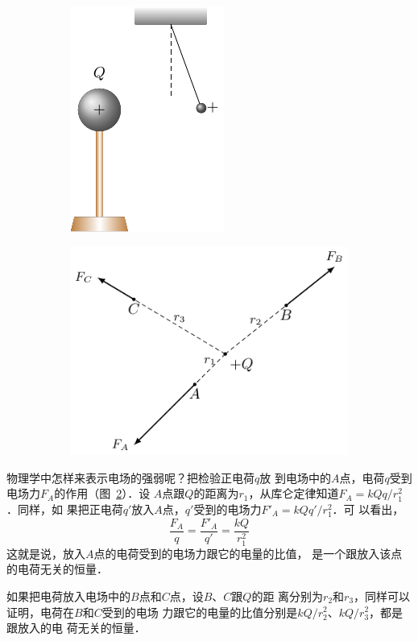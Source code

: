 \begin{figure}[htbp]
	\centering
	\begin{subfigure}{0.4\linewidth}
		\centering
		\includegraphics{fig/B/6-4a.pdf}
		\caption{}\label{fig_B_6-4a}
	\end{subfigure}
	\hfil
	\begin{subfigure}{0.4\linewidth}
		\centering
		\includegraphics{fig/B/6-4b.pdf}
		\caption{}\label{fig_B_6-4b}
	\end{subfigure}
	\caption{}\label{fig_B_6-4}
\end{figure}



物理学中怎样来表示电场的强弱呢？把检验正电荷$q$放
到电场中的$A$点，电荷$q$受到电场力$F_A$的作用（图~\ref{fig_B_6-4b}）．设
$A$点跟$Q$的距离为$r_1$，从库仑定律知道$F_A=kQq/r^2_1$．同样，如
果把正电荷$q'$放入$A$点，$q'$受到的电场力$F'_A=kQq'/r_1^2$．可
以看出，
\[\frac{F_A}{q}=\frac{F'_A}{q'}=\frac{kQ}{r^2_1} \]
这就是说，放入$A$点的电荷受到的电场力跟它的电量的比值，
是一个跟放入该点的电荷无关的恒量．

如果把电荷放入电场中的$B$点和$C$点，设$B$、$C$跟$Q$的距
离分别为$r_2$和$r_3$，同样可以证明，电荷在$B$和$C$受到的电场
力跟它的电量的比值分别是$kQ/r^2_2$、$kQ/r_3^2$，都是跟放入的电
荷无关的恒量．

